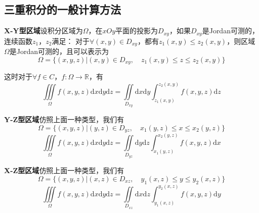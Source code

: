 \documentclass[UTF8,openany]{book}
\begin{document}
	\subsection{三重积分的一般计算方法}
	\par \textbf{X-Y型区域}\quad 设积分区域为$\Omega$，在$xOy$平面的投影为$D_{xy}$，如果$D_{xy}$是Jordan可测的，连续函数$z_1$，$z_2$满足：
	对于$\forall(x,y)\in D_{xy}$，都有$z_1(x,y)\leqslant z_2(x,y)$，则区域$\Omega$是Jordan可测的，且可以表示为
	$$\Omega=\{(x,y,z)|(x,y)\in D_{xy},\quad z_1(x,y)\leqslant z\leqslant z_2(x,y)\}$$
	\par 这时对于$\forall f\in C$，$f:\Omega\rightarrow\mathbb{R}$，有
	$$\iiint\limits_{\Omega}f(x,y,z)\mathrm{d}x\mathrm{d}y\mathrm{d}z=
	\iint\limits_{D_{xy}}\mathrm{d}x\mathrm{d}y\int_{z_1(x,y)}^{z_2(x,y)}f(x,y,z)\mathrm{d}z$$
	\par \textbf{Y-Z型区域}\quad 仿照上面一种类型，我们有
	$$\Omega=\{(x,y,z)|(y,z)\in D_{yz},\quad x_1(y,z)\leqslant x\leqslant x_2(y,z)\}$$
	$$\iiint\limits_{\Omega}f(x,y,z)\mathrm{d}x\mathrm{d}y\mathrm{d}z=
	\iint\limits_{D_{yz}}\mathrm{d}y\mathrm{d}z\int_{x_1(y,z)}^{x_2(y,z)}f(x,y,z)\mathrm{d}x$$
	\par \textbf{X-Z型区域}\quad 仿照上面一种类型，我们有
	$$\Omega=\{(x,y,z)|(x,z)\in D_{xz},\quad y_1(x,z)\leqslant y\leqslant y_2(x,z)\}$$
	$$\iiint\limits_{\Omega}f(x,y,z)\mathrm{d}x\mathrm{d}y\mathrm{d}z=
	\iint\limits_{D_{xz}}\mathrm{d}x\mathrm{d}z\int_{y_1(x,z)}^{y_2(x,z)}f(x,y,z)\mathrm{d}y$$
\end{document}
